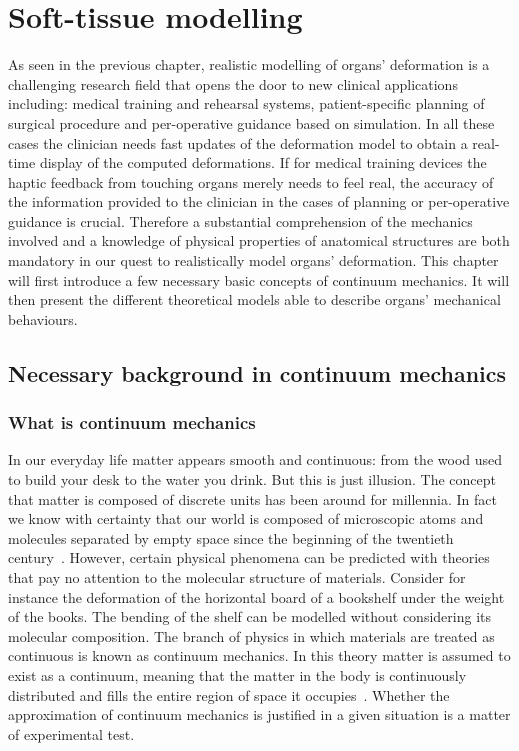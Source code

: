 \chapter{Soft-tissue modelling}
\label{chap:softtissue}
\begin{shortAbstract}
As seen in the previous chapter, realistic modelling of organs' deformation is a challenging research field that opens the door to new clinical applications including: medical training and rehearsal systems, patient-specific planning of surgical procedure and per-operative guidance based on simulation. In all these cases the clinician needs fast updates of the deformation model to obtain a real-time display of the computed deformations. If for medical training devices the haptic feedback from touching organs merely needs to feel real, the accuracy of the information provided to the clinician in the cases of planning or per-operative guidance is crucial. Therefore a substantial comprehension of the mechanics involved and a knowledge of physical properties of anatomical structures are both mandatory in our quest to realistically model organs' deformation. This chapter will first introduce a few necessary basic concepts of continuum mechanics. It will then present the different theoretical models able to describe organs' mechanical behaviours. 
\end{shortAbstract}



\section{Necessary background in continuum mechanics}

\subsection{What is continuum mechanics}
In our everyday life matter appears smooth and continuous: from the wood used to build your desk to the water you drink. But this is just illusion. The concept that matter is composed of discrete units has been around for millennia. In fact we know with certainty that our world is composed of microscopic atoms and molecules separated by empty space since the beginning of the twentieth century~\cite{Lautrup05}. However, certain physical phenomena can be predicted with theories that pay no attention to the molecular structure of materials. Consider for instance the deformation of the horizontal board of a bookshelf under the weight of the books. The bending of the shelf can be modelled without considering its molecular composition. The branch of physics in which materials are treated as continuous is known as continuum mechanics. In this theory matter is assumed to exist as a continuum, meaning that the matter in the body is continuously distributed and fills the entire region of space it occupies~\cite{Lai96}. Whether the approximation of continuum mechanics is justified in a given situation is a matter of experimental test. 

